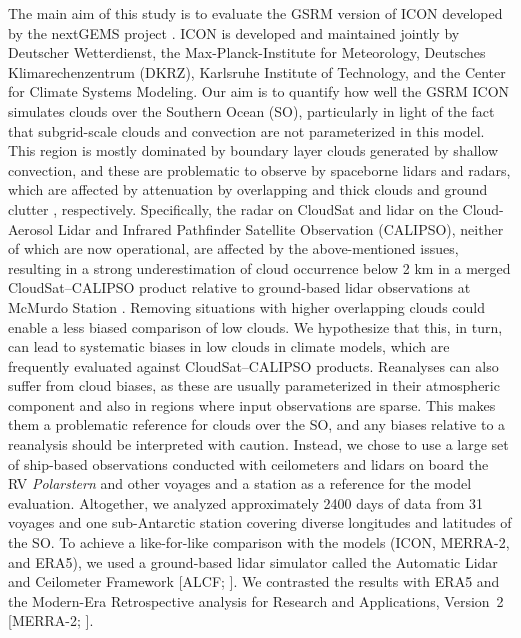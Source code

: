 \documentclass[draft]{agujournal2019}
\begin{document}
The main aim of this study is to evaluate the GSRM version of ICON developed by the nextGEMS project \cite{nextgems,segura2025}. ICON is developed and maintained jointly by Deutscher Wetterdienst, the Max-Planck-Institute for Meteorology, Deutsches Klimarechenzentrum (DKRZ), Karlsruhe Institute of Technology, and the Center for Climate Systems Modeling. Our aim is to quantify how well the GSRM ICON simulates clouds over the Southern Ocean (SO), particularly in light of the fact that subgrid-scale clouds and convection are not parameterized in this model. This region is mostly dominated by boundary layer clouds generated by shallow convection, and these are problematic to observe by spaceborne lidars and radars, which are affected by attenuation by overlapping and thick clouds \cite{mace2009,medeiros2010} and ground clutter \cite{marchand2008}, respectively. Specifically, the radar on CloudSat and lidar on the Cloud-Aerosol Lidar and Infrared Pathfinder Satellite Observation (CALIPSO), neither of which are now operational, are affected by the above-mentioned issues, resulting in a strong underestimation of cloud occurrence below 2 km in a merged CloudSat--CALIPSO product relative to ground-based lidar observations at McMurdo Station \cite{mcerlich2021}. Removing situations with higher overlapping clouds could enable a less biased comparison of low clouds. We hypothesize that this, in turn, can lead to systematic biases in low clouds in climate models, which are frequently evaluated against CloudSat--CALIPSO products. Reanalyses can also suffer from cloud biases, as these are usually parameterized in their atmospheric component and also in regions where input observations are sparse. This makes them a problematic reference for clouds over the SO, and any biases relative to a reanalysis should be interpreted with caution. Instead, we chose to use a large set of ship-based observations conducted with ceilometers and lidars on board the RV \emph{Polarstern} and other voyages and a station as a reference for the model evaluation. Altogether, we analyzed approximately 2400 days of data from 31 voyages and one sub-Antarctic station covering diverse longitudes and latitudes of the SO. To achieve a like-for-like comparison with the models (ICON, MERRA-2, and ERA5), we used a ground-based lidar simulator called the Automatic Lidar and Ceilometer Framework [ALCF; ]. We contrasted the results with ERA5 \cite{era5} and the Modern-Era Retrospective analysis for Research and Applications, Version~2 [MERRA-2; ].
\end{document}
